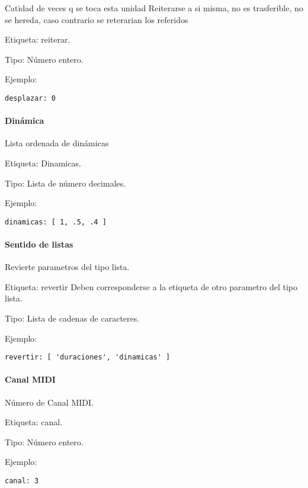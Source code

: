 \documentclass[]{article}
\let\oldparagraph\paragraph
\renewcommand{\paragraph}[1]{\oldparagraph{#1}\mbox{}}
\begin{document}
Catidad de veces q se toca esta unidad Reiterarse a si misma, no es
trasferible, no se hereda, caso contrario se reterarian los referidos

Etiqueta: reiterar.

Tipo: Número entero.

Ejemplo:

\begin{Verbatim}
desplazar: 0
\end{Verbatim}

\hypertarget{dinuxe1mica}{%
\paragraph{Dinámica}\label{dinuxe1mica}}

Lista ordenada de dinámicas

Etiqueta: Dinamicas.

Tipo: Lista de número decimales.

Ejemplo:

\begin{Verbatim}
dinamicas: [ 1, .5, .4 ]
\end{Verbatim}

\hypertarget{sentido-de-listas}{%
\paragraph{Sentido de listas}\label{sentido-de-listas}}

Revierte parametros del tipo lista.

Etiqueta: revertir Deben corresponderse a la etiqueta de otro parametro
del tipo lista.

Tipo: Lista de cadenas de caracteres.

Ejemplo:

\begin{Verbatim}
revertir: [ 'duraciones', 'dinamicas' ]
\end{Verbatim}

\hypertarget{canal-midi}{%
\paragraph{Canal MIDI}\label{canal-midi}}

Número de Canal MIDI.

Etiqueta: canal.

Tipo: Número entero.

Ejemplo:

\begin{Verbatim}
canal: 3
\end{Verbatim}
\end{document}
